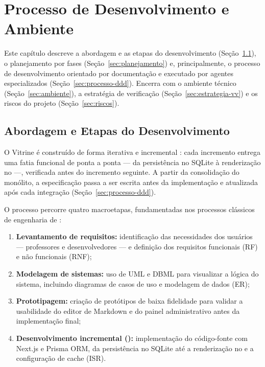 \chapter{Processo de Desenvolvimento e Ambiente}\label{cap:metodologia}

Este capítulo descreve a abordagem e as etapas do desenvolvimento (Seção~\ref{sec:abordagem}), o planejamento por fases (Seção~\ref{sec:planejamento}) e, principalmente, o processo de desenvolvimento orientado por documentação e executado por agentes especializados (Seção~\ref{sec:processo-ddd}). Encerra com o ambiente técnico (Seção~\ref{sec:ambiente}), a estratégia de verificação (Seção~\ref{sec:estrategia-vv}) e os riscos do projeto (Seção~\ref{sec:riscos}).

\section{Abordagem e Etapas do Desenvolvimento}\label{sec:abordagem}

O Vitrine é construído de forma iterativa e incremental \cite{sommerville2011}: cada incremento entrega uma fatia funcional de ponta a ponta --- da persistência no SQLite à renderização no  ---, verificada antes do incremento seguinte. A partir da consolidação do monólito, a especificação passa a ser escrita antes da implementação e atualizada após cada integração (Seção~\ref{sec:processo-ddd}).

O processo percorre quatro macroetapas, fundamentadas nos processos clássicos de engenharia de  \cite{sommerville2011,pressman2021}:

\begin{enumerate}
  \item \textbf{Levantamento de requisitos:} identificação das necessidades dos usuários --- professores e desenvolvedores --- e definição dos requisitos funcionais (RF) e não funcionais (RNF);
  \item \textbf{Modelagem de sistemas:} uso de UML e DBML para visualizar a lógica do sistema, incluindo diagramas de casos de uso e modelagem de dados (ER);
  \item \textbf{Prototipagem:} criação de protótipos de baixa fidelidade para validar a usabilidade do editor de Markdown e do painel administrativo antes da implementação final;
  \item \textbf{Desenvolvimento incremental ():} implementação do código-fonte com Next.js e Prisma ORM, da persistência no SQLite até a renderização no  e a configuração de cache (ISR).
\end{enumerate}

